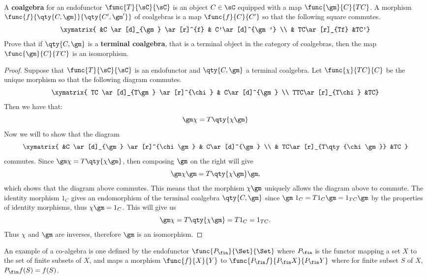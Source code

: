 \documentclass[../../main]{subfiles}
\begin{document}
\paragraph{}
\begin{exercise}
	A {\bf coalgebra} for an endofunctor $\func{T}{\sC}{\sC}$ is an object $C
	\in \sC$ equipped with a map $\func{\gm}{C}{TC}$. A morphism
	$\func{f}{\qty{C,\gm}}{\qty{C',\gm'}}$ of coalgebras is a map
	$\func{f}{C}{C'}$ so that the following square commutes.
	\[\xymatrix{ &C \ar[d]_{\gm} \ar[r]^{f} & C'\ar[d]^{\gm'}  \\  &
	TC\ar[r]_{Tf} &TC'}\]
	Prove that if $\qty{C,\gm}$ is a {\bf terminal coalgebra}, that is
	a terminal object in the category of coalgebras, then the map
	$\func{\gm}{C}{TC}$ is an isomorphism.
\end{exercise}
\begin{proof}
	Suppose that $\func{T}{\sC}{\sC}$ is an endofunctor and $\qty{C,\gm}$ a
	terminal coalgebra. Let $\func{\chi}{TC}{C}$ be the unique morphism so that
	the following diagram commutes.
	\[\xymatrix{ TC \ar[d]_{T\gm} \ar[r]^{\chi} & C\ar[d]^{\gm} \\
	TTC\ar[r]_{T\chi} &TC}\]
	Then we
	have that: $$ \gm  \chi = T\qty{\chi \gm}    $$ Now we will
	to show that the diagram $$\xymatrix{ &C \ar[d]_{\gm} \ar[r]^{\chi
	\gm} & C\ar[d]^{\gm}  \\  & TC\ar[r]_{T\qty{\chi  \gm}} &TC   } $$
	commutes. Since $ \gm  \chi = T\qty{\chi  \gm}    $, then
	composing $\gm$ on the right will give $$ \gm  \chi  \gm =
	T\qty{\chi  \gm}  \gm,   $$ which shows that the diagram above
	commutes. This means that the morphism $\chi  \gm$ uniquely allows
	the diagram above to commute. The identity morphism $1_C$ gives an
	endomorphism of the terminal coalgebra $\qty{C,\gm}$ since $\gm  \
	1_{C} = T1_{C}  \gm = 1_{TC}  \gm$ by the properties of
	identity morphisms, thus $\chi  \gm = 1_{C}$. This will give us
	$$\gm  \chi = T\qty{\chi  \gm}  = T1_{C} = 1_{TC}.$$ Thus
	$\chi$ and $\gm$ are inverses, therefore $\gm$ is an isomorphism.
\end{proof}

An example of a co-algebra is one defined by the endofunctor
$\func{P_{\fin}}{\Set}{\Set}$ where $P_{\fin}$ is the functor mapping a set $X$ to
the set of finite subsets of $X$, and maps a morphism $\func{f}{X}{Y}$ to
$\func{P_{\fin}f}{P_{\fin}X}{P_{\fin}Y}$ where for finite subset $S$ of $X$,
$P_{\fin}f(S) = f(S)$.
\end{document}
